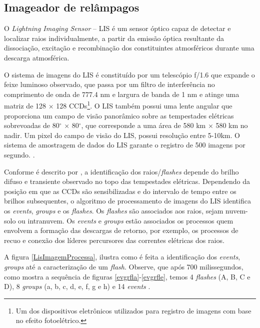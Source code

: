 
\subsection{Imageador de relâmpagos}

O \textit{Lightning Imaging Sensor} -- LIS  é um sensor óptico capaz de detectar e localizar raios individualmente, a partir da emissão óptica resultante da dissociação, excitação e recombinação dos constituintes atmosféricos durante uma descarga atmosférica. 

O sistema de imagens do LIS é constituído por um telescópio f/1.6 que expande o feixe luminoso observado, que passa por um filtro de interferência no comprimento de onda de 777.4 nm e largura de banda de 1 nm e atinge uma matriz de 128 $\times$ 128 CCDs\footnote{Um dos dispositivos eletrônicos utilizados para registro de imagens com base no efeito fotoelétrico.}. O LIS também possui uma lente angular que proporciona um campo de visão panorâmico sobre as tempestades elétricas sobrevoadas de 80$^{\circ}$ $\times$ 80$^{\circ}$, que corresponde a uma área de 580 km $\times$ 580 km no nadir. Um pixel do campo de visão do LIS, possui resolução entre 5-10km. O sistema de amostragem de dados do LIS garante o registro de 500 imagens por segundo. \cite{christian2000LISalgorithm,boccippio1996science,trmmhandbook}. 

Conforme é descrito por , a identificação dos raios/\textit{flashes} depende do brilho difuso e transiente observado no topo das tempestades elétricas. Dependendo da posição em que as CCDs são sensibilizadas e do intervalo de tempo entre os brilhos subsequentes, o algoritmo de processamento de imagens do LIS identifica os \textit{events}, \textit{groups} e os \textit{flashes}. Os \textit{flashes} são associados aos raios, sejam nuvem-solo ou intranuvem. Os \textit{events} e \textit{groups} estão associados os processos quem envolvem a formação das descargas de retorno, por exemplo, os processos de recuo e conexão dos líderes percursores das correntes elétricas dos raios.  

A figura \ref{LisImagemProcessa}, ilustra como é feita a identificação dos  \textit{events}, \textit{groups} até a caracterização de um \textit{flash}. Observe, que após 700 milissegundos, como mostra a sequência de figuras \ref{evgrfla}-\ref{evgrfle}, temos 4 \textit{flashes} (A, B, C e D),  8 \textit{groups} (a, b, c, d, e, f, g e h) e 14 \textit{events} \cite{christian2000LISalgorithm}.


